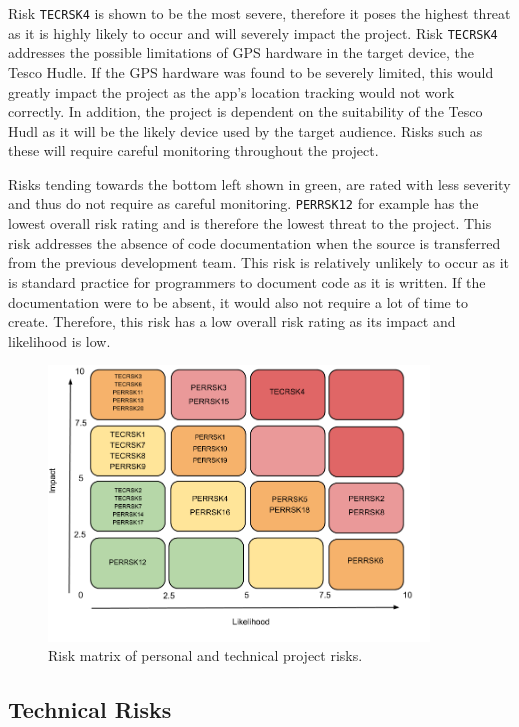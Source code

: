 \documentclass[11pt,a4paper]{article}
\begin{document}
Risk \texttt{TECRSK4} is shown to be the most severe, therefore it poses the highest threat as it is highly likely to occur and will severely impact the project. Risk \texttt{TECRSK4}  addresses the possible limitations of GPS hardware in the target device, the Tesco Hudle. If the GPS hardware was found to be severely limited, this would greatly impact the project as the app's location tracking would not work correctly. In addition, the project is dependent on the suitability of the Tesco Hudl as it will be the likely device used by the target audience. Risks such as these will require careful monitoring throughout the project. 

Risks tending towards the bottom left shown in green, are rated with less severity and thus do not require as careful monitoring. \texttt{PERRSK12} for example has the lowest overall risk rating and is therefore the lowest threat to the project. This risk addresses the absence of code documentation when the source is transferred from the previous development team. This risk is relatively unlikely to occur as it is standard practice for programmers to document code as it is written. If the documentation were to be absent, it would also not require a lot of time to create. Therefore, this risk has a low overall risk rating as its impact and likelihood is low.

\begin{figure}[h!]
\centering
\includegraphics[width=0.9\textwidth]{./img/RiskMatrix}
\caption{Risk matrix of personal and technical project risks.}
\label{fig:RiskMatrix}
\end{figure}


\subsection{Technical Risks}
\label{sec:tech-risks}
\end{document}
